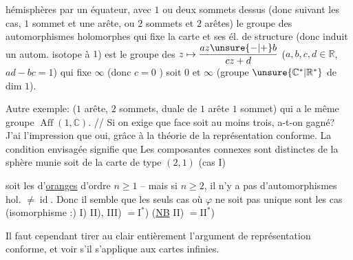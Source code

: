 hémisphères par un équateur, avec $1$ ou
deux sommets dessus (donc suivant les
cas, $1$ sommet et une arête, ou $2$ sommets
et $2$ arêtes) le groupe des automorphismes
holomorphes qui fixe la carte et ses
él. de structure (donc induit un
autom. isotope à $1$) est le groupe des
$z\mapsto\dfrac{az\unsure{-|+}b}{cz+d}$ ($a,b,c,d\in\mathbb{R}$, $ad-bc=1$) qui fixe
$\infty$ (donc $c=0$  )
soit $0$ et $\infty$ (groupe $\unsure{\mathbb{C}^*|\mathbb{R}^*}$ de dim $1$).

Autre exemple:
($1$ arête, $2$ sommets,
duale de $1$ arête $1$ sommet) qui a
le même groupe $\operatorname{Aff}(1,\mathbb{C})$. // Si on exige
que  
face  soit au
moins trois, a-t-on gagné? J'ai
l'impression que oui, grâce à la
théorie de la représentation conforme.
La condition envisagée signifie que
Les composantes connexes sont 
distinctes de la sphère munie
soit de la carte de type $(2,1)$ (cas I)

soit les  d'\uline{oranges} d'ordre $n\geq1$
-- mais si $n\geq2$, il n'y a pas
d'automorphismes hol. $\neq\operatorname{id}$.
Donc il semble que les seuls cas
où $\varphi$ ne soit pas unique sont les cas
(isomorphisme :) I) II), III) $=\mathrm{I}^*$) (\uline{NB} II) $=\mathrm{II}^*$)

Il faut cependant tirer au clair
entièrement l'argument de représentation
conforme, et voir s'il s'applique
aux cartes infinies.

